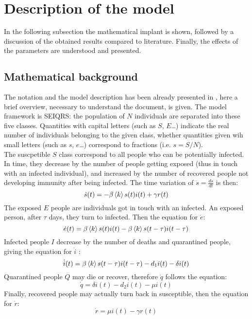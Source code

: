 \section{Description of the model}
\label{sec:model}

In the following subsection the mathematical implant is shown, followed by a discussion of the obtained results compared to literature. Finally, the effects of the parameters are understood and presented.

\subsection{Mathematical background}
The notation and the model description has been already presented in \cite{MingLiu}, here a brief overview, necessary to understand the document, is given. The model framework is SEIQRS: the population of $N$ individuals are separated into these five classes. Quantities with capital letters (such as $S$, $E$\dots) indicate the real number of individuals belonging to the given class, whether quantities given wih small letters (such as $s$, $e$\dots) correspond to fractions (i.e. $s = S/N$). \\

The suscpetible $S$ class correspond to all people who can be potentially infected. In time, they decrease by the number of people getting exposed (thus in touch with an infected individual), and increased by the number of recovered people not developing immunity after being infected. The time variation of $\dot{s} = \frac{ds}{dt}$ is then:
\begin{equation}
\dot{s} (t)= -\beta\braket{k}s(t)i(t)+\gamma{r(t)} 
\end{equation} 
The exposed $E$ people are individuals got in touch with an infected. An exposed person, after $\tau$ days, they turn to infected. Then the equation for $\dot{e}$:
\begin{equation}
\dot{e} (t)= \beta\braket{k}s(t)i(t) - \beta\braket{k}s(t-\tau)i(t-\tau) 
\end{equation} 
Infected people $I$ decrease by the number of deaths and quarantined people, giving the equation for $\dot{i}$ :
\begin{equation}
\dot{i} (t)= \beta\braket{k}s(t-\tau)i(t-\tau) - d_1i(t) - \delta {i(t)}
\end{equation} 
Quarantined people $Q$ may die or recover, therefore $\dot{q}$ follows the equation:
\begin{equation}
\dot{q} = \delta{i(t)} - d_2{i(t)} - \mu{i(t)}
\end{equation}
Finally, recovered people may actually turn back in susceptible, then the equation for $\dot{r}$:
\begin{equation}
\dot{r} = \mu{i(t)}-\gamma{r(t)}
\end{equation}

